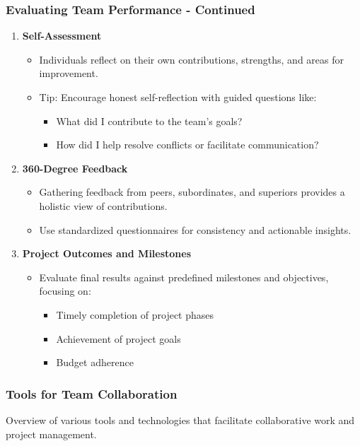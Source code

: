 \documentclass[aspectratio=169]{beamer}
\begin{document}
\begin{frame}[fragile]
    \frametitle{Evaluating Team Performance - Continued}
    \begin{enumerate}[resume]
        \item \textbf{Self-Assessment}
            \begin{itemize}
                \item Individuals reflect on their own contributions, strengths, and areas for improvement.
                \item Tip: Encourage honest self-reflection with guided questions like: 
                \begin{itemize}
                    \item What did I contribute to the team’s goals?
                    \item How did I help resolve conflicts or facilitate communication?
                \end{itemize}
            \end{itemize}
        \item \textbf{360-Degree Feedback}
            \begin{itemize}
                \item Gathering feedback from peers, subordinates, and superiors provides a holistic view of contributions.
                \item Use standardized questionnaires for consistency and actionable insights.
            \end{itemize}
        \item \textbf{Project Outcomes and Milestones}
            \begin{itemize}
                \item Evaluate final results against predefined milestones and objectives, focusing on:
                \begin{itemize}
                    \item Timely completion of project phases
                    \item Achievement of project goals
                    \item Budget adherence
                \end{itemize}
            \end{itemize}
    \end{enumerate}
\end{frame}

\begin{frame}[fragile]
    \frametitle{Tools for Team Collaboration}
    Overview of various tools and technologies that facilitate collaborative work and project management.
\end{frame}
\end{document}
